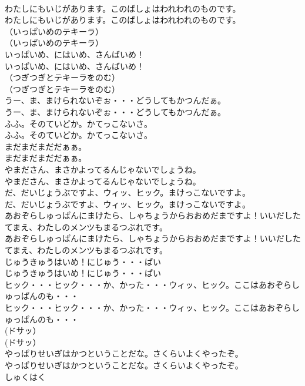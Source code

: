 \documentclass[8pt]{extreport}
\begin{document}
\begin{CJK}{UTF8}{min}
\\	わたしにもいじがあります。このばしょはわれわれのものです。	
\\	わたしにもいじがあります。このばしょはわれわれのものです。 
\\	（いっぱいめのテキーラ）	
\\	（いっぱいめのテキーラ） 
\\	いっぱいめ、にはいめ、さんばいめ！	
\\	いっぱいめ、にはいめ、さんばいめ！ 
\\	（つぎつぎとテキーラをのむ）	
\\	（つぎつぎとテキーラをのむ） 
\\	うー、ま、まけられないぞぉ・・・どうしてもかつんだぁ。	
\\	うー、ま、まけられないぞぉ・・・どうしてもかつんだぁ。 
\\	ふふ。そのていどか。かてっこないさ。	
\\	ふふ。そのていどか。かてっこないさ。 
\\	まだまだまだだぁぁ。	
\\	まだまだまだだぁぁ。 
\\	やまださん、まさかよってるんじゃないでしょうね。	
\\	やまださん、まさかよってるんじゃないでしょうね。 
\\	だ、だいじょうぶですよ、ウィッ、ヒック。まけっこないですよ。	
\\	だ、だいじょうぶですよ、ウィッ、ヒック。まけっこないですよ。 
\\	あおぞらしゅっぱんにまけたら、しゃちょうからおおめだまですよ！いいだしたてまえ、わたしのメンツもまるつぶれです。	
\\	あおぞらしゅっぱんにまけたら、しゃちょうからおおめだまですよ！いいだしたてまえ、わたしのメンツもまるつぶれです。 
\\	じゅうきゅうはいめ！にじゅう・・・ぱい	
\\	じゅうきゅうはいめ！にじゅう・・・ぱい 
\\	ヒック・・・ヒック・・・か、かった・・・ウィッ、ヒック。ここはあおぞらしゅっぱんのも・・・	
\\	ヒック・・・ヒック・・・か、かった・・・ウィッ、ヒック。ここはあおぞらしゅっぱんのも・・・ 
\\	(ドサッ）	
\\	(ドサッ） 
\\	やっぱりせいぎはかつということだな。さくらいよくやったぞ。	
\\	やっぱりせいぎはかつということだな。さくらいよくやったぞ。 
\\	しゅくはく

\end{CJK}
\end{document}
